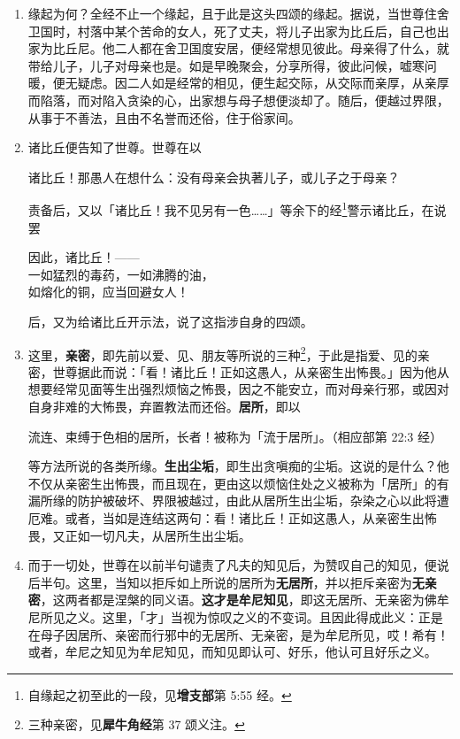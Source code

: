 \begin{enumerate}\item 缘起为何？全经不止一个缘起，且于此是这头四颂的缘起。据说，当世尊住舍卫国时，村落中某个苦命的女人，死了丈夫，将儿子出家为比丘后，自己也出家为比丘尼。他二人都在舍卫国度安居，便经常想见彼此。母亲得了什么，就带给儿子，儿子对母亲也是。如是早晚聚会，分享所得，彼此问候，嘘寒问暖，便无疑虑。因二人如是经常的相见，便生起交际，从交际而亲厚，从亲厚而陷落，而对陷入贪染的心，出家想与母子想便淡却了。随后，便越过界限，从事于不善法，且由不名誉而还俗，住于俗家间。
\item 诸比丘便告知了世尊。世尊在以\begin{quoting}诸比丘！那愚人在想什么：没有母亲会执著儿子，或儿子之于母亲？\end{quoting}责备后，又以「诸比丘！我不见另有一色……」等余下的经\footnote{自缘起之初至此的一段，见\textbf{增支部}第 5:55 经。}警示诸比丘，在说罢\begin{quoting}因此，诸比丘！——\\一如猛烈的毒药，一如沸腾的油，\\如熔化的铜，应当回避女人！\end{quoting}后，又为给诸比丘开示法，说了这指涉自身的四颂。
\item 这里，\textbf{亲密}，即先前以爱、见、朋友等所说的三种\footnote{三种亲密，见\textbf{犀牛角经}第 37 颂义注。}，于此是指爱、见的亲密，世尊据此而说：「看！诸比丘！正如这愚人，从亲密生出怖畏。」因为他从想要经常见面等生出强烈烦恼之怖畏，因之不能安立，而对母亲行邪，或因对自身非难的大怖畏，弃置教法而还俗。\textbf{居所}，即以\begin{quoting}流连、束缚于色相的居所，长者！被称为「流于居所」。（相应部第 22:3 经）\end{quoting}等方法所说的各类所缘。\textbf{生出尘垢}，即生出贪嗔痴的尘垢。这说的是什么？他不仅从亲密生出怖畏，而且现在，更由这以烦恼住处之义被称为「居所」的有漏所缘的防护被破坏、界限被越过，由此从居所生出尘垢，杂染之心以此将遭厄难。或者，当如是连结这两句：看！诸比丘！正如这愚人，从亲密生出怖畏，又正如一切凡夫，从居所生出尘垢。
\item 而于一切处，世尊在以前半句谴责了凡夫的知见后，为赞叹自己的知见，便说后半句。这里，当知以拒斥如上所说的居所为\textbf{无居所}，并以拒斥亲密为\textbf{无亲密}，这两者都是涅槃的同义语。\textbf{这才是牟尼知见}，即这无居所、无亲密为佛牟尼所见之义。这里，「才」当视为惊叹之义的不变词。且因此得成此义：正是在母子因居所、亲密而行邪中的无居所、无亲密，是为牟尼所见，哎！希有！或者，牟尼之知见为牟尼知见，而知见即认可、好乐，他认可且好乐之义。\end{enumerate}

